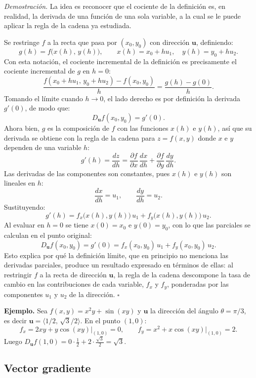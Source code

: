 \textit{Demostración.} La idea es reconocer que el cociente de la definición es, en realidad, la derivada de una función de una sola variable, a la cual se le puede aplicar la regla de la cadena ya estudiada.

Se restringe $f$ a la recta que pasa por $(x_0, y_0)$ con dirección $\mathbf{u}$, definiendo:
\[
g(h) = f\bigl(x(h),\, y(h)\bigr), \qquad x(h) = x_0 + hu_1, \quad y(h) = y_0 + hu_2.
\]
Con esta notación, el cociente incremental de la definición es precisamente el cociente incremental de $g$ en $h = 0$:
\[
\frac{f(x_0 + hu_1,\, y_0 + hu_2) - f(x_0, y_0)}{h}
= \frac{g(h) - g(0)}{h}.
\]
Tomando el límite cuando $h \to 0$, el lado derecho es por definición la derivada $g'(0)$, de modo que:
\[
D_{\mathbf{u}} f(x_0, y_0) = g'(0).
\]
Ahora bien, $g$ es la composición de $f$ con las funciones $x(h)$ e $y(h)$, así que su derivada se obtiene con la regla de la cadena para $z = f(x, y)$ donde $x$ e $y$ dependen de una variable $h$:
\[
g'(h) = \frac{dz}{dh}
= \frac{\partial f}{\partial x}\,\frac{dx}{dh} + \frac{\partial f}{\partial y}\,\frac{dy}{dh}.
\]
Las derivadas de las componentes son constantes, pues $x(h)$ e $y(h)$ son lineales en $h$:
\[
\frac{dx}{dh} = u_1, \qquad \frac{dy}{dh} = u_2.
\]
Sustituyendo:
\[
g'(h) = f_x\bigl(x(h), y(h)\bigr)\,u_1 + f_y\bigl(x(h), y(h)\bigr)\,u_2.
\]
Al evaluar en $h = 0$ se tiene $x(0) = x_0$ e $y(0) = y_0$, con lo que las parciales se calculan en el punto original:
\[
D_{\mathbf{u}} f(x_0, y_0) = g'(0) = f_x(x_0, y_0)\,u_1 + f_y(x_0, y_0)\,u_2.
\]
Esto explica por qué la definición límite, que en principio no menciona las derivadas parciales, produce un resultado expresado en términos de ellas: al restringir $f$ a la recta de dirección $\mathbf{u}$, la regla de la cadena descompone la tasa de cambio en las contribuciones de cada variable, $f_x$ y $f_y$, ponderadas por las componentes $u_1$ y $u_2$ de la dirección. $\square$

\textbf{Ejemplo.} Sea $f(x, y) = x^2 y + \sin(xy)$ y $\mathbf{u}$ la dirección del ángulo $\theta = \pi/3$, es decir $\mathbf{u} = \langle 1/2,\, \sqrt{3}/2 \rangle$. En el punto $(1, 0)$:
\[
f_x = 2xy + y\cos(xy)\big|_{(1,0)} = 0, \qquad f_y = x^2 + x\cos(xy)\big|_{(1,0)} = 2.
\]
Luego $D_{\mathbf{u}} f(1, 0) = 0 \cdot \tfrac{1}{2} + 2 \cdot \tfrac{\sqrt{3}}{2} = \sqrt{3}$.

\subsection{Vector gradiente}

